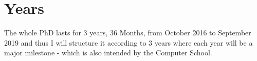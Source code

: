 \section{Years}
The whole PhD lasts for 3 years, 36 Months, from October 2016 to September 2019 and thus I will structure it according to 3 years where each year will be a major milestone - which is also intended by the Computer School.







